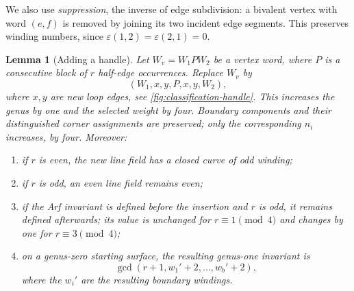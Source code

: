 \documentclass[11pt]{amsart}
\theoremstyle{definition}
\theoremstyle{plain}
\newtheorem{lemma}[lemma]{Lemma}
\theoremstyle{definition}
\theoremstyle{definition}
\begin{document}
We also use \emph{suppression}, the inverse of edge subdivision:
a bivalent vertex with word $(e,f)$ is removed by joining
its two incident edge segments. This preserves winding numbers,
since $\varepsilon(1,2)=\varepsilon(2,1)=0$.
\begin{lemma}[Adding a handle]
\label{lem:classification-handle}
Let $W_v=W_1PW_2$ be a vertex word, where $P$ is a consecutive
block of $r$ half-edge occurrences.  Replace $W_v$ by
\begin{equation}
\label{eq:classification-handle}
  (W_1,x,y,P,x,y,W_2),
\end{equation}
where $x,y$ are new loop edges, see \cref{fig:classification-handle}. This increases the genus by one and the
selected weight by four.  Boundary components and their distinguished
corner assignments are preserved; only the corresponding $n_i$
increases, by four.  Moreover:
\begin{enumerate}[label=\textup{(\roman*)}]
\item if $r$ is even, the new line field has a closed curve of odd winding;
\item if $r$ is odd, an even line field remains even;
\item if the Arf invariant is defined before the insertion
and $r$ is odd, it remains defined afterwards; its value
is unchanged for $r\equiv1\pmod4$ and changes by one
for $r\equiv3\pmod4$;
\item on a genus-zero starting surface, the resulting genus-one invariant is
\begin{equation}
\label{eq:classification-handle-gcd}
 \gcd(r+1,w_1'+2,\ldots,w_b'+2),
\end{equation}
where the $w_i'$ are the resulting boundary windings.
\end{enumerate}
\end{lemma}
\end{document}
